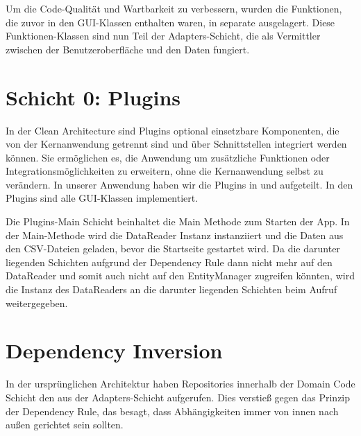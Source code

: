 Um die Code-Qualität und Wartbarkeit zu verbessern, wurden die Funktionen, die zuvor in den GUI-Klassen enthalten waren, in separate \href{https://github.com/MichaelaHaag/RezeptApp/tree/main/1-Adapter/src/main/java/de/rezeptapp/adapter/GUIFunktionen}{} ausgelagert. Diese Funktionen-Klassen sind nun Teil der Adapters-Schicht, die als Vermittler zwischen der Benutzeroberfläche und den Daten fungiert.


\section{Schicht 0: Plugins}
In der Clean Architecture sind Plugins optional einsetzbare Komponenten, die von der Kernanwendung getrennt sind und über Schnittstellen integriert werden können. Sie ermöglichen es, die Anwendung um zusätzliche Funktionen oder Integrationsmöglichkeiten zu erweitern, ohne die Kernanwendung selbst zu verändern. In unserer Anwendung haben wir die Plugins in \href{https://github.com/MichaelaHaag/RezeptApp/tree/main/0-Plugins}{} und \href{https://github.com/MichaelaHaag/RezeptApp/tree/main/0-Plugins-Main}{} aufgeteilt.
In den Plugins sind alle GUI-Klassen implementiert.

Die Plugins-Main Schicht beinhaltet die Main Methode zum Starten der App. In der Main-Methode wird die DataReader Instanz instanziiert und die Daten aus den CSV-Dateien geladen, bevor die Startseite gestartet wird. Da die darunter liegenden Schichten aufgrund der Dependency Rule dann nicht mehr auf den DataReader und somit auch nicht auf den EntityManager zugreifen könnten, wird die Instanz des DataReaders an die darunter liegenden Schichten beim Aufruf weitergegeben.


\section{Dependency Inversion}
\label{DI}
In der ursprünglichen Architektur haben Repositories innerhalb der Domain Code Schicht den  aus der Adapters-Schicht aufgerufen. Dies verstieß gegen das Prinzip der Dependency Rule, das besagt, dass Abhängigkeiten immer von innen nach außen gerichtet sein sollten.

